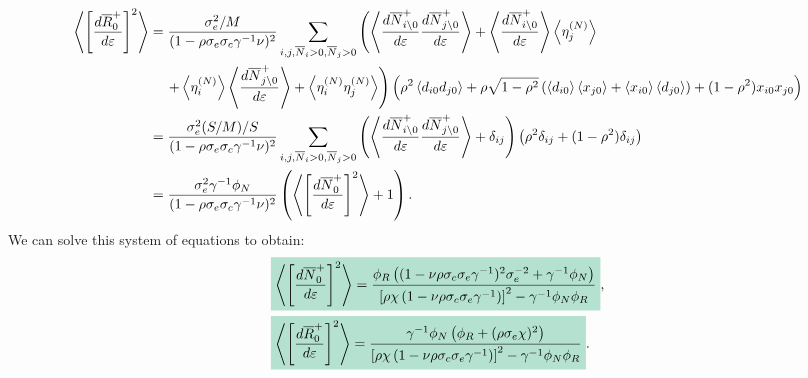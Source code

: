 \documentclass[10pt]{article}
\newcommand{\mathcolorbox}[1]{\colorbox{hlcol}{$\displaystyle #1$}}
\newcommand{\eval}[1]{\left\langle #1 \right\rangle}
\begin{document}
\begin{align}
	\eval{
	\left[
		\frac{d\overline R_0^+}{d\varepsilon}
	\right]^2
	}
	&=
	\frac{\sigma_e^2/M}{
		(1
	-
	\rho \sigma_e \sigma_c \gamma^{-1} \nu)^2 }
	\sum_{i,j,\overline N_i>0,\overline N_j>0}
	\left(
		\eval{
		\frac{
			d\overline N_{i \setminus 0}^+
		}{d\varepsilon}
		\frac{
			d\overline N_{j \setminus 0}^+
		}{d\varepsilon}
		}
		+
		\eval{
		\frac{
			d\overline N_{i \setminus 0}^+
		}{d\varepsilon}
		}
		\eval{\eta_j^{(N)}}
	\right.
		\\
		\nonumber
		&\hspace{0.4cm}
	\left.
		+
		\eval{\eta_i^{(N)}}
		\eval{
		\frac{
			d\overline N_{j \setminus 0}^+
		}{d\varepsilon}
		}
		+
		\eval{
		\eta_i^{(N)}
		\eta_j^{(N)}
		}
	\right)
	\left(
		\rho^2 
		\eval{
		d_{i0}
		d_{j0}}
		+
		\rho
		\sqrt{1-\rho^2}
		\left(
		\eval{d_{i0}}
		\eval{x_{j0}}
		+
		\eval{x_{i0}}
		\eval{d_{j0}}
		\right)
		+
		(1-\rho^2)
		x_{i0}
		x_{j0}
	\right)
	\\
	\nonumber
	&=
	\frac{\sigma_e^2(S/M)/S}{(1-\rho\sigma_e\sigma_c\gamma^{-1}\nu)^2}
	\sum_{i,j,\overline N_i>0,\overline N_j>0}
	\left(
		\eval{
			\frac{d\overline N_{i\setminus0}^+}{d\varepsilon}
			\frac{d\overline N_{j\setminus0}^+}{d\varepsilon}
		}
		+
		\delta_{ij}
	\right)
	\left(
		\rho^2 \delta_{ij}
		+
		(1-\rho^2)\delta_{ij}
	\right)
	\\
	&=
	\frac{\sigma_e^2\gamma^{-1} \phi_N}{(1-\rho\sigma_e\sigma_c\gamma^{-1}\nu)^2}
	\left(
		\eval{
			\left[
				\frac{d\overline N_0^+}{d\varepsilon}
			\right]^2
		}
		+
		1
	\right)
	.
\end{align}
We can solve this system of equations to obtain:
\begin{align}
	&
	\mathcolorbox{\eval{
		\left[
			\frac{d\overline N_0^+}{d\varepsilon}
		\right]^2
	}
	=
	\frac{
		\phi_R \left(
			(1-\nu\rho\sigma_c\sigma_e
			\gamma^{-1})^2
			\sigma_e^{-2}
			+
			\gamma^{-1}\phi_N
		\right)
	}{
		\left[
			\rho\chi\left(
				1-\nu \rho \sigma_c \sigma_e\gamma^{-1}
			\right)
		\right]^2
		-\gamma^{-1}\phi_N\phi_R
	}},
	\\
	&
	\mathcolorbox{
	\eval{
		\left[
			\frac{d\overline R_0^+}{d\varepsilon}
		\right]^2
	}
	=
	\frac{
		\gamma^{-1}\phi_N\left(
			\phi_R+(\rho\sigma_e\chi)^2
		\right)
	}{
		\left[
			\rho\chi\left(
				1-\nu \rho \sigma_c \sigma_e\gamma^{-1}
			\right)
		\right]^2
		-\gamma^{-1}\phi_N\phi_R
	}}.
\end{align}
\end{document}
